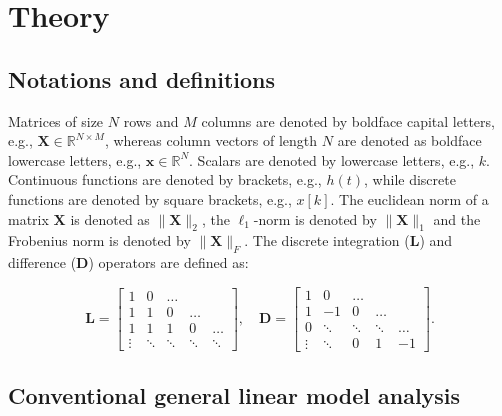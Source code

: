 
\section{Theory}

\subsection{Notations and definitions}

Matrices of size $N$ rows and $M$ columns are denoted by boldface capital letters, e.g., $\mathbf{X} \in \mathbb{R}^{N\times M}$, whereas column vectors of length $N$ are denoted as boldface lowercase letters, e.g., $\mathbf{x} \in \mathbb{R}^{N}$. Scalars are denoted by lowercase letters, e.g., $k$. Continuous functions are denoted by brackets, e.g., $h(t)$, while discrete functions are denoted by square brackets, e.g., $x[k]$. The euclidean norm of a matrix $\mathbf{X}$ is denoted as $\|\mathbf{X}\|_2$, the $\ell_1$-norm is denoted by $\| \mathbf{X} \|_1$ and the Frobenius norm is denoted by $\| \mathbf{X} \|_F$. The discrete integration ($\mathbf{L}$) and difference ($\mathbf{D}$) operators are defined as:

$$
\mathbf{L} = \left[\begin{array}{ccccc}
1 & 0 & \ldots & & \\
1 & 1 & 0 & \ldots & \\
1 & 1 & 1 & 0 & \ldots \\
\vdots & \ddots & \ddots & \ddots & \ddots
\end{array}\right], \quad \mathbf{D} = \left[\begin{array}{ccccc}
1 & 0 & \ldots & & \\
1 & -1 & 0 & \ldots & \\
0 & \ddots & \ddots & \ddots & \ldots \\
\vdots & \ddots & 0 & 1 & -1
\end{array}\right].
$$

\subsection{Conventional general linear model analysis}

